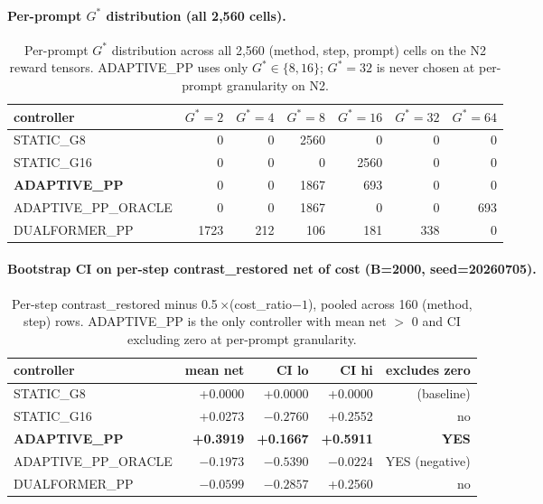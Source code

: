 \paragraph{Per-prompt $G^*$ distribution (all 2,560 cells).}

\begin{table}[h]
\centering\small
\caption{Per-prompt $G^*$ distribution across all 2,560 (method, step, prompt)
cells on the N2 reward tensors. ADAPTIVE\_PP uses only $G^* \in \{8, 16\}$;
$G^*=32$ is never chosen at per-prompt granularity on N2.}
\label{tab:p7-iter131-gstar-dist}
\begin{tabular}{lrrrrrr}
\toprule
controller & $G^*=2$ & $G^*=4$ & $G^*=8$ & $G^*=16$ & $G^*=32$ & $G^*=64$ \\
\midrule
STATIC\_G8               & 0    & 0    & 2560 & 0    & 0    & 0    \\
STATIC\_G16              & 0    & 0    & 0    & 2560 & 0    & 0    \\
\textbf{ADAPTIVE\_PP}    & 0    & 0    & 1867 & 693  & 0    & 0    \\
ADAPTIVE\_PP\_ORACLE     & 0    & 0    & 1867 & 0    & 0    & 693  \\
DUALFORMER\_PP           & 1723 & 212  & 106  & 181  & 338  & 0    \\
\bottomrule
\end{tabular}
\end{table}

\paragraph{Bootstrap CI on per-step contrast\_restored net of cost
(B=2000, seed=20260705).}

\begin{table}[h]
\centering\small
\caption{Per-step contrast\_restored minus 0.5\,$\times$(cost\_ratio$-1$),
pooled across 160 (method, step) rows. ADAPTIVE\_PP is the only controller
with mean net $>$ 0 and CI excluding zero at per-prompt granularity.}
\label{tab:p7-iter131-bootstrap-ci}
\begin{tabular}{lrrrr}
\toprule
controller & mean net & CI lo & CI hi & excludes zero \\
\midrule
STATIC\_G8               & +0.0000 & +0.0000 & +0.0000 & (baseline) \\
STATIC\_G16              & +0.0273 & $-0.2760$ & +0.2552 & no          \\
\textbf{ADAPTIVE\_PP}    & \textbf{+0.3919} & \textbf{+0.1667} & \textbf{+0.5911} & \textbf{YES} \\
ADAPTIVE\_PP\_ORACLE     & $-0.1973$ & $-0.5390$ & $-0.0224$ & YES (negative) \\
DUALFORMER\_PP           & $-0.0599$ & $-0.2857$ & +0.2560 & no \\
\bottomrule
\end{tabular}
\end{table}

